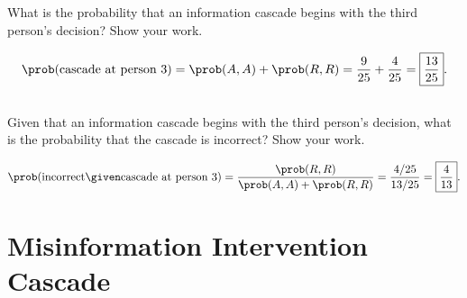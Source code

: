 \documentclass[newpages]{assignment}
\begin{document}
\subsection{}
\begin{problem}
    What is the probability that an information cascade begins with the third person's decision? Show your work.
\end{problem}
\begin{solution}
    \[
        \prob(\text{cascade at person 3})
        =\prob(A,A)+\prob(R,R)
        =\frac{9}{25}+\frac{4}{25}
        =\boxed{\frac{13}{25}}.
    \]
\end{solution}

\subsection{}
\begin{problem}
    Given that an information cascade begins with the third person's decision, what is the probability that the cascade is incorrect? Show your work.
\end{problem}
\begin{solution}
    \[
        \prob(\text{incorrect}\given\text{cascade at person 3})
        =\frac{\prob(R,R)}{\prob(A,A)+\prob(R,R)}
        =\frac{4/25}{13/25}
        =\boxed{\frac{4}{13}}.
    \]
\end{solution}

\section{Misinformation Intervention Cascade}
\end{document}
